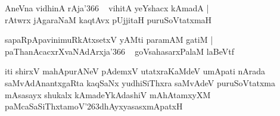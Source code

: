 \documentclass[twoside,12pt,openright]{book}
\def\S{\char'263}
\newcounter{shloka}[chapter]
\begin{document}
\begin{shloka}%
AneVna vidhinA rAja\char'366 ~ vihitA yeYshacx kAmadA |\\
rAtwrx jAgaraNaM kaqtAvx pUjjitaH puruSoVtatxmaH
\end{shloka}

\begin{shloka}%
sapaRpApavinimuRkAtxsetxV yAMti paramAM gatiM |\\
paThanAcacxrXvaNAdArxja\char'366 ~ goVsahasarxPalaM laBeVtf
\end{shloka}

\begin{center}
iti shirxV mahApurANeV pAdemxV utatxraKaMdeV umApati nArada saMvAdAnantxgaRta kaqSaNx 
yudhiSiThxra saMvAdeV puruSoVtatxma mAsasayx shukalx kAmadeYkAdashiV mAhAtamxyXM 
paMcaSaSiThxtamoV\S dhAyxyasasxmApatxH
\end{center}
\end{document}
